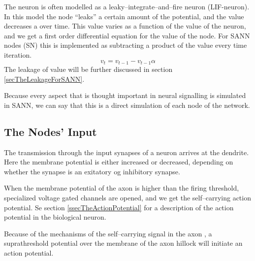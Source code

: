 	The neuron is
					 often modelled as a leaky--integrate--and--fire neuron (LIF-neuron). %
	In this model the node ``leaks'' a certain amount of the potential, and the value decreases a over time. 
	This value varies as a function of the value of the neuron, and we get a first order differential equation for the value of the node.
	For SANN nodes (SN) this is implemented as subtracting a product of the value every time iteration. 
	\begin{equation}
	v_t = v_{t-1} - v_{t-1}  \alpha %
	\end{equation}
	The leakage of value will be further discussed in section \ref{secTheLeakageForSANN}.

	Because every aspect that is thought important in neural signalling is simulated in SANN, 
		we can say that this is a direct simulation of each node of the network.   %
	

	\subsection{The Nodes' Input}
	The transmission through the input synapses of a neuron arrives at the dendrite. 
	Here the membrane potential is either increased or decreased, depending on whether the synapse is an exitatory og inhibitory synapse.

	When the membrane potential of the axon is higher than the firing threshold, specialized voltage gated channels are opened, and we get the self--carrying action potential. 
	Se section \ref{ssecTheActionPotential} for a description of the action potential in the biological neuron.
	
	Because of the mechanisms of the self--carrying signal in the axon %
		, a suprathreshold potential over the membrane of the axon hillock will initiate an action potential.

